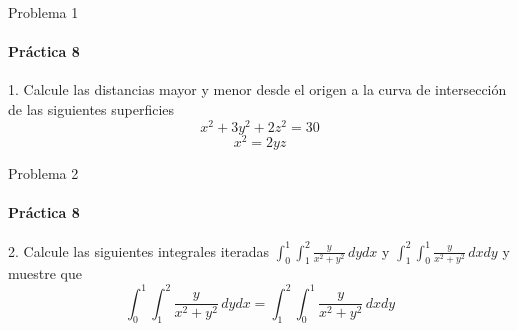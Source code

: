 \documentclass{plantillaPPT}
\begin{document}
\primeraDiapo

\begin{frame}{Problema 1}
\framesubtitle{Práctica 8}

1. Calcule las distancias mayor y menor desde el origen a la curva de intersección de las siguientes superficies
\[
x^2+3y^2+2z^2=30
\]
\[
x^2=2yz
\]
    
\end{frame}

\begin{frame}{Problema 2}
\framesubtitle{Práctica 8}

2. Calcule las siguientes integrales iteradas $\int_0^1\int_1^2\frac{y}{x^2+y^2}\,dydx$ y $\int_1^2\int_0^1\frac{y}{x^2+y^2}\,dxdy$ y muestre que
\[
\int_0^1\int_1^2\frac{y}{x^2+y^2}\,dydx = \int_1^2\int_0^1\frac{y}{x^2+y^2}\,dxdy
\]
    
\end{frame}
\end{document}
